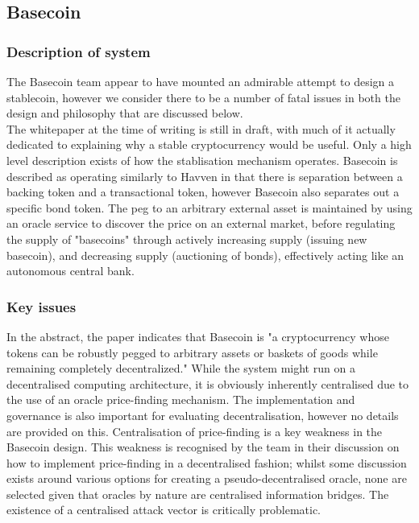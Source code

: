 \documentclass{article}
\begin{document}
\subsection{Basecoin}

\subsubsection{Description of system}

The Basecoin team appear to have mounted an admirable attempt to design a stablecoin, however we consider there to be a number of fatal issues in both the design and philosophy that are discussed below. \\

\noindent The whitepaper at the time of writing is still in draft, with much of it actually dedicated to explaining why a stable cryptocurrency would be useful. Only a high level description exists of how the stablisation mechanism operates. Basecoin is described as operating similarly to Havven in that there is separation between a backing token and a transactional token, however Basecoin also separates out a specific bond token. The peg to an arbitrary external asset is maintained by using an oracle service to discover the price on an external market, before regulating the supply of "basecoins" through actively increasing supply (issuing new basecoin), and decreasing supply (auctioning of bonds), effectively acting like an autonomous central bank.

\subsubsection{Key issues}

\noindent In the abstract, the paper indicates that Basecoin is "a cryptocurrency whose tokens can be robustly pegged to arbitrary assets or baskets of goods while remaining completely decentralized." While the system might run on a decentralised computing architecture, it is obviously inherently centralised due to the use of an oracle price-finding mechanism. The implementation and governance is also important for evaluating decentralisation, however no details are provided on this. Centralisation of price-finding is a key weakness in the Basecoin design. This weakness is recognised by the team in their discussion on how to implement price-finding in a decentralised fashion; whilst some discussion exists around various options for creating a pseudo-decentralised oracle, none are selected given that oracles by nature are centralised information bridges. The existence of a centralised attack vector is critically problematic. \\
\end{document}
